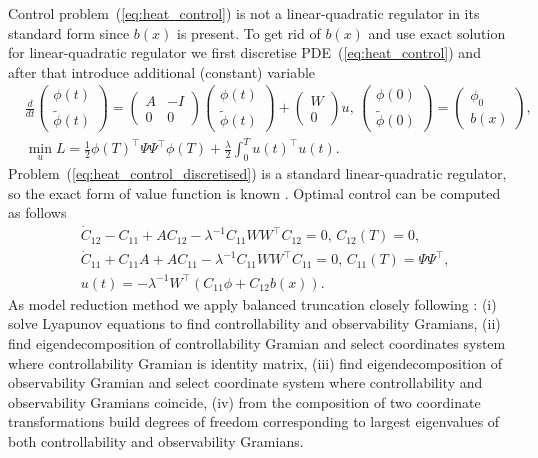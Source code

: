 \documentclass{article}
\begin{document}
Control problem~(\ref{eq:heat_control}) is not a linear-quadratic regulator in its standard form since $b(x)$ is present. To get rid of $b(x)$ and use exact solution for linear-quadratic regulator we first discretise PDE~(\ref{eq:heat_control}) and after that introduce additional (constant) variable
\begin{equation}
	\label{eq:heat_control_discretised}
	\begin{split}
		&\frac{d}{dt}\begin{pmatrix}\phi(t)\\\widetilde{\phi}(t)\end{pmatrix} = \begin{pmatrix}A&-I\\0&0\end{pmatrix}\begin{pmatrix}\phi(t)\\\widetilde{\phi}(t)\end{pmatrix}  + \begin{pmatrix}W\\0\end{pmatrix} u,\,\begin{pmatrix}\phi(0)\\\widetilde{\phi}(0)\end{pmatrix} = \begin{pmatrix}\phi_0\\b(x)\end{pmatrix},\\
		&\min_{u} L = \frac{1}{2}\phi(T)^\top\Psi \Psi^{\top}\phi(T) + \frac{\lambda}{2}\int_{0}^{T}u(t)^\top u(t).
	\end{split}
\end{equation}
Problem~(\ref{eq:heat_control_discretised}) is a standard linear-quadratic regulator, so the exact form of value function is known \cite{kirk2004optimal}. Optimal control can be computed as follows
\begin{equation}
	\begin{split}
		&\dot{C}_{12} - C_{11} + A C_{12} -\lambda^{-1} C_{11}WW^\top C_{12} = 0,\,C_{12}(T) = 0,\\
		&\dot{C}_{11} + C_{11}A + A C_{11} - \lambda^{-1} C_{11}W W^\top C_{11} = 0 ,\,C_{11}(T) = \Psi \Psi^{\top},\\
		&u(t) = -\lambda^{-1} W^\top \left(C_{11}\phi + C_{12} b(x)\right).
	\end{split}
\end{equation}
As model reduction method we apply balanced truncation closely following \cite{moore2003principal}: (i) solve Lyapunov equations to find controllability and observability Gramians, (ii) find eigendecomposition of controllability Gramian and select coordinates system where controllability Gramian is identity matrix, (iii) find eigendecomposition of observability Gramian and select coordinate system where controllability and observability Gramians coincide, (iv) from the composition of two coordinate transformations build degrees of freedom corresponding to largest eigenvalues of both controllability and observability Gramians.
\end{document}
